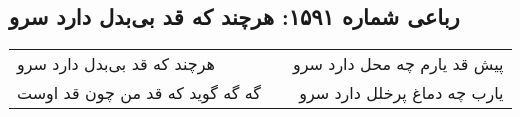 \begin{center}
\section*{رباعی شماره ۱۵۹۱: هرچند که قد بی‌بدل دارد سرو}
\label{sec:1591}
\begin{longtable}{l p{0.5cm} r}
هرچند که قد بی‌بدل دارد سرو
&&
پیش قد یارم چه محل دارد سرو
\\
گه گه گوید که قد من چون قد اوست
&&
یارب چه دماغ پرخلل دارد سرو
\\
\end{longtable}
\end{center}
